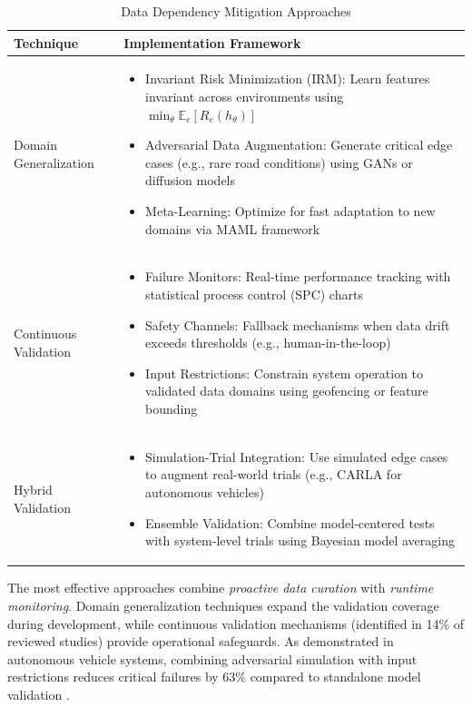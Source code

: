 \documentclass[manuscript,screen,review]{acmart}
\begin{document}
\begin{table}[h]
\centering
\caption{Data Dependency Mitigation Approaches}
\label{tab:mitigation}
\begin{tabular}{p{}p{}}
\hline
\textbf{Technique} & \textbf{Implementation Framework} \\
\hline
Domain Generalization & \begin{itemize}
    \item Invariant Risk Minimization (IRM): Learn features invariant across environments using $\min_{\theta}\mathbb{E}_{e}[R_{e}(h_{\theta})]$
    \item Adversarial Data Augmentation: Generate critical edge cases (e.g., rare road conditions) using GANs or diffusion models
    \item Meta-Learning: Optimize for fast adaptation to new domains via MAML framework
\end{itemize} \\
\hline
Continuous Validation & \begin{itemize}
    \item Failure Monitors: Real-time performance tracking with statistical process control (SPC) charts
    \item Safety Channels: Fallback mechanisms when data drift exceeds thresholds (e.g., human-in-the-loop)
    \item Input Restrictions: Constrain system operation to validated data domains using geofencing or feature bounding
\end{itemize} \\
\hline
Hybrid Validation & \begin{itemize}
    \item Simulation-Trial Integration: Use simulated edge cases to augment real-world trials (e.g., CARLA for autonomous vehicles)
    \item Ensemble Validation: Combine model-centered tests with system-level trials using Bayesian model averaging
\end{itemize} \\
\hline
\end{tabular}
\end{table}

The most effective approaches combine \textit{proactive data curation} with \textit{runtime monitoring}. Domain generalization techniques expand the validation coverage during development, while continuous validation mechanisms (identified in 14\% of reviewed studies) provide operational safeguards. As demonstrated in autonomous vehicle systems, combining adversarial simulation with input restrictions reduces critical failures by 63\% compared to standalone model validation .
\end{document}
